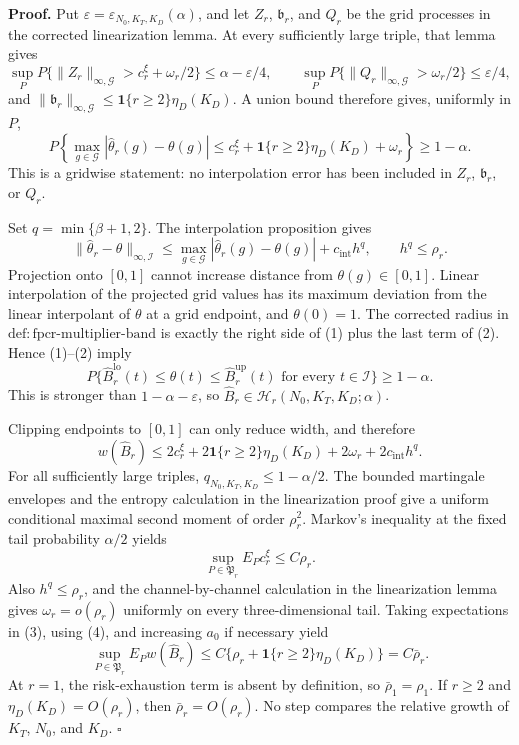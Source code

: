 \textbf{Proof.}
Put \(\varepsilon=\varepsilon_{N_0,K_T,K_D}(\alpha)\), and let \(Z_r\), \(\mathfrak b_r\), and \(Q_r\) be the grid processes in the corrected linearization lemma. At every sufficiently large triple, that lemma gives
\[
 \sup_P P\{\|Z_r\|_{\infty,\mathcal G}>c_r^\xi+\omega_r/2\}
 \le\alpha-\varepsilon/4,
 \qquad
 \sup_P P\{\|Q_r\|_{\infty,\mathcal G}>\omega_r/2\}
 \le\varepsilon/4,
\]
and \(\|\mathfrak b_r\|_{\infty,\mathcal G}\le\mathbf 1\{r\ge2\}\eta_D(K_D)\). A union bound therefore gives, uniformly in \(P\),
\[
 P\!\left\{
 \max_{g\in\mathcal G}|\widehat\theta_r(g)-\theta(g)|
 \le c_r^\xi+\mathbf 1\{r\ge2\}\eta_D(K_D)+\omega_r
 \right\}\ge1-\alpha. \tag{1}
\]
This is a gridwise statement: no interpolation error has been included in \(Z_r\), \(\mathfrak b_r\), or \(Q_r\).

Set \(q=\min\{\beta+1,2\}\). The interpolation proposition gives
\[
 \|\widehat\theta_r-\theta\|_{\infty,\mathcal I}
 \le\max_{g\in\mathcal G}|\widehat\theta_r(g)-\theta(g)|
 +c_{\mathrm{int}}h^q,
 \qquad h^q\le\rho_r. \tag{2}
\]
Projection onto \([0,1]\) cannot increase distance from \(\theta(g)\in[0,1]\). Linear interpolation of the projected grid values has its maximum deviation from the linear interpolant of \(\theta\) at a grid endpoint, and \(\theta(0)=1\). The corrected radius in \(\mathrm{def:fpcr\mbox{-}multiplier\mbox{-}band}\) is exactly the right side of (1) plus the last term of (2). Hence (1)--(2) imply
\[
 P\{\widehat B_r^{\mathrm{lo}}(t)\le\theta(t)\le
 \widehat B_r^{\mathrm{up}}(t)\text{ for every }t\in\mathcal I\}
 \ge1-\alpha.
\]
This is stronger than \(1-\alpha-\varepsilon\), so \(\widehat B_r\in\mathcal H_r(N_0,K_T,K_D;\alpha)\).

Clipping endpoints to \([0,1]\) can only reduce width, and therefore
\[
 w(\widehat B_r)
 \le2c_r^\xi+2\mathbf 1\{r\ge2\}\eta_D(K_D)
 +2\omega_r+2c_{\mathrm{int}}h^q. \tag{3}
\]
For all sufficiently large triples, \(q_{N_0,K_T,K_D}\le1-\alpha/2\). The bounded martingale envelopes and the entropy calculation in the linearization proof give a uniform conditional maximal second moment of order \(\rho_r^2\). Markov's inequality at the fixed tail probability \(\alpha/2\) yields
\[
 \sup_{P\in\mathfrak P_r}E_Pc_r^\xi\le C\rho_r. \tag{4}
\]
Also \(h^q\le\rho_r\), and the channel-by-channel calculation in the linearization lemma gives \(\omega_r=o(\rho_r)\) uniformly on every three-dimensional tail. Taking expectations in (3), using (4), and increasing \(a_0\) if necessary yield
\[
 \sup_{P\in\mathfrak P_r}E_Pw(\widehat B_r)
 \le C\{\rho_r+\mathbf 1\{r\ge2\}\eta_D(K_D)\}
 =C\bar\rho_r. \tag{5}
\]
At \(r=1\), the risk-exhaustion term is absent by definition, so \(\bar\rho_1=\rho_1\). If \(r\ge2\) and \(\eta_D(K_D)=O(\rho_r)\), then \(\bar\rho_r=O(\rho_r)\). No step compares the relative growth of \(K_T\), \(N_0\), and \(K_D\). \(\square\)